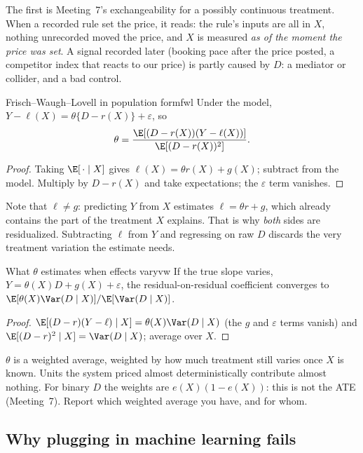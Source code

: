 \documentclass[11pt]{article}
\begin{document}
The first is Meeting~7's exchangeability for a possibly continuous treatment. When a recorded rule set the price, it reads: the
rule's inputs are all in $X$, nothing unrecorded moved the price, and $X$ is measured \emph{as of the moment the price was set}. A
signal recorded later (booking pace after the price posted, a competitor index that reacts to our price) is partly caused by $D$:
a mediator or collider, and a bad control.

\begin{prop}{Frisch--Waugh--Lovell in population form}{fwl}
Under the model, $Y - \ell(X) = \theta\{D - r(X)\} + \varepsilon$, so
\[
  \theta = \frac{\E[(D - r(X))(Y - \ell(X))]}{\E[(D - r(X))^2]} .
\]
\end{prop}
\begin{proof}
Taking $\E[\,\cdot \mid X]$ gives $\ell(X) = \theta r(X) + g(X)$; subtract from the model. Multiply by $D - r(X)$ and take expectations;
the $\varepsilon$ term vanishes.
\end{proof}

Note that $\ell \ne g$: predicting $Y$ from $X$ estimates $\ell = \theta r + g$, which already contains the part of the treatment $X$
explains. That is why \emph{both} sides are residualized. Subtracting $\ell$ from $Y$ and regressing on raw $D$ discards the very
treatment variation the estimate needs.

\begin{prop}{What $\theta$ estimates when effects vary}{vw}
If the true slope varies, $Y = \theta(X)D + g(X) + \varepsilon$, the residual-on-residual coefficient converges to
$\E[\theta(X)\Var(D \mid X)]/\E[\Var(D \mid X)]$.
\end{prop}
\begin{proof}
$\E[(D - r)(Y - \ell) \mid X] = \theta(X)\Var(D \mid X)$ (the $g$ and $\varepsilon$ terms vanish) and $\E[(D-r)^2 \mid X] = \Var(D \mid X)$;
average over $X$.
\end{proof}

$\theta$ is a weighted average, weighted by how much treatment still varies once $X$ is known. Units the system priced almost
deterministically contribute almost nothing. For binary $D$ the weights are $e(X)(1-e(X))$: this is not the ATE (Meeting~7).
Report which weighted average you have, and for whom.

\subsection{Why plugging in machine learning fails}
\end{document}

